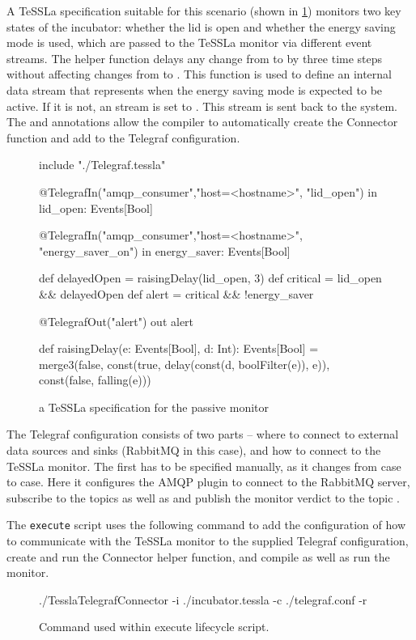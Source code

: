 A TeSSLa specification suitable for this scenario (shown in \cref{fig:tessla_spec_passive}) monitors two key states of the incubator: whether the lid is open and whether the energy saving mode is used, which are passed to the TeSSLa monitor via different event streams.
The helper function  delays any change from  to  by three time steps without affecting changes from  to .
This function is used to define an internal data stream  that represents when the energy saving mode is expected to be active.
If it is not, an  stream is set to .
This stream is sent back to the system.
The  and  annotations allow the compiler to automatically create the Connector function and add to the Telegraf configuration.
%
\begin{figure}[ht]
	\begin{textcode}
		include "./Telegraf.tessla"

		@TelegrafIn("amqp_consumer","host=<hostname>", "lid_open")
		in lid_open: Events[Bool]

		@TelegrafIn("amqp_consumer","host=<hostname>", "energy_saver_on")
		in energy_saver: Events[Bool]

		def delayedOpen = raisingDelay(lid_open, 3)
		def critical = lid_open && delayedOpen
		def alert = critical && !energy_saver

		@TelegrafOut("alert")
		out alert

		def raisingDelay(e: Events[Bool], d: Int):
		Events[Bool] = merge3(false, const(true, delay(const(d, boolFilter(e)), e)), const(false, falling(e)))
	\end{textcode}
	\caption{a TeSSLa specification for the passive monitor}
	\label{fig:tessla_spec_passive}
\end{figure}%
%
The Telegraf configuration consists of two parts -- where to connect to external data sources and sinks (RabbitMQ in this case), and how to connect to the TeSSLa monitor.
The first has to be specified manually, as it changes from case to case.
Here it configures the AMQP plugin to connect to the RabbitMQ server, subscribe to the topics  as well as  and publish the monitor verdict to the topic .

The \texttt{execute} script uses the following command to add the configuration of how to communicate with the TeSSLa monitor to the supplied Telegraf configuration, create and run the Connector helper function, and compile as well as run the monitor.%
%
\begin{figure}[ht]
	\begin{textcode}
		./TesslaTelegrafConnector -i ./incubator.tessla -c ./telegraf.conf -r
	\end{textcode}
	\caption{Command used within execute lifecycle script.}
\end{figure}%

